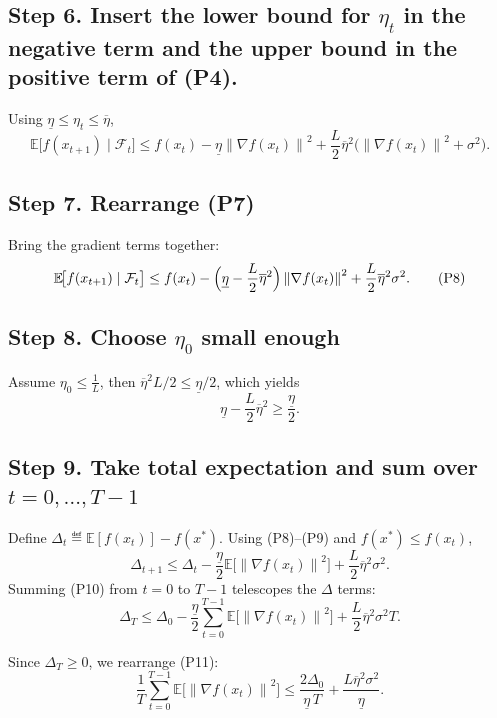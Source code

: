 \documentclass{article}
\newcommand{\E}{\mathbb{E}}
\newcommand{\norm}[1]{\left\|#1\right\|}
\newcommand{\grad}{\nabla}
\begin{document}
\subsection*{Step 6. Insert the lower bound for $\eta_{t}$ in the negative term
and the upper bound in the positive term of (P4).}
Using $\underline{\eta}\le\eta_{t}\le\overline{\eta}$,
\[
\E\!\bigl[f(x_{t+1})\mid\mathcal F_{t}\bigr]
\le f(x_{t})-\underline{\eta}\norm{\grad f(x_{t})}^{2}
     +\frac{L}{2}\overline{\eta}^{2}
        \bigl(\norm{\grad f(x_{t})}^{2}+\sigma^{2}\bigr).
\tag{P7}
\]

\subsection*{Step 7. Rearrange (P7)}
Bring the gradient terms together:
\[
\E\!\bigl[f(x_{t+1})\mid\mathcal F_{t}\bigr]
\le f(x_{t})
-\Bigl(\underline{\eta}-\frac{L}{2}\overline{\eta}^{2}\Bigr)\norm{\grad f(x_{t})}^{2}
+\frac{L}{2}\overline{\eta}^{2}\sigma^{2}.
\tag{P8}
\]

\subsection*{Step 8. Choose $\eta_{0}$ small enough}
Assume $\eta_{0}\le \frac{1}{L}$, then $\overline{\eta}^{2}L/2\le \underline{\eta}/2$,
which yields
\[
\underline{\eta}-\frac{L}{2}\overline{\eta}^{2}
\ge \frac{\underline{\eta}}{2}.
\tag{P9}
\]

\subsection*{Step 9. Take total expectation and sum over $t=0,\dots,T-1$}
Define $\Delta_{t}\eqdef \E[f(x_{t})]-f(x^{*})$. Using (P8)–(P9) and $f(x^{*})\le f(x_{t})$,
\[
\Delta_{t+1}
\le \Delta_{t}
-\frac{\underline{\eta}}{2}\E\!\bigl[\norm{\grad f(x_{t})}^{2}\bigr]
+\frac{L}{2}\overline{\eta}^{2}\sigma^{2}.
\tag{P10}
\]
Summing (P10) from $t=0$ to $T-1$ telescopes the $\Delta$ terms:
\[
\Delta_{T}\le \Delta_{0}
-\frac{\underline{\eta}}{2}\sum_{t=0}^{T-1}
   \E\!\bigl[\norm{\grad f(x_{t})}^{2}\bigr]
+\frac{L}{2}\overline{\eta}^{2}\sigma^{2}T .
\tag{P11}
\]

Since $\Delta_{T}\ge0$, we rearrange (P11):
\[
\frac{1}{T}\sum_{t=0}^{T-1}\E\!\bigl[\norm{\grad f(x_{t})}^{2}\bigr]
\le \frac{2\Delta_{0}}{\underline{\eta}\,T}
   +\frac{L\overline{\eta}^{2}\sigma^{2}}{\underline{\eta}} .
\tag{P12}
\]
\end{document}
